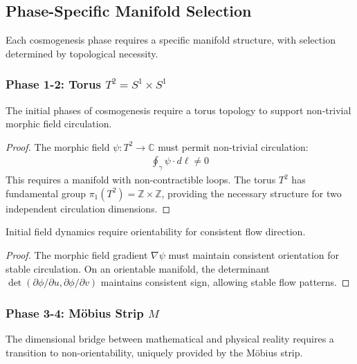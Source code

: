 \subsection{Phase-Specific Manifold Selection}

Each cosmogenesis phase requires a specific manifold structure, with selection determined by topological necessity.

\subsubsection{Phase 1-2: Torus $T^2 = S^1 \times S^1$}

\begin{theorem}
The initial phases of cosmogenesis require a torus topology to support non-trivial morphic field circulation.
\end{theorem}

\begin{proof}
The morphic field $\psi: T^2 \rightarrow \mathbb{C}$ must permit non-trivial circulation:
\begin{align}
\oint_{\gamma} \psi \cdot d\ell \neq 0
\end{align}
This requires a manifold with non-contractible loops. The torus $T^2$ has fundamental group $\pi_1(T^2) = \mathbb{Z} \times \mathbb{Z}$, providing the necessary structure for two independent circulation dimensions.
\end{proof}

\begin{lemma}
Initial field dynamics require orientability for consistent flow direction.
\end{lemma}

\begin{proof}
The morphic field gradient $\nabla \psi$ must maintain consistent orientation for stable circulation. On an orientable manifold, the determinant $\det(\partial\phi/\partial u, \partial\phi/\partial v)$ maintains consistent sign, allowing stable flow patterns.
\end{proof}

\subsubsection{Phase 3-4: Möbius Strip $M$}

\begin{theorem}
The dimensional bridge between mathematical and physical reality requires a transition to non-orientability, uniquely provided by the Möbius strip.
\end{theorem}

